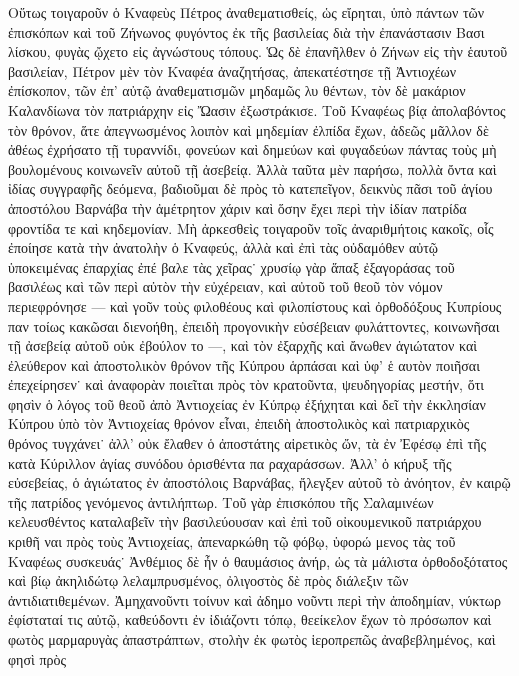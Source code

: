 Οὕτως τοιγαροῦν ὁ Κναφεὺς Πέτρος ἀναθεματισθείς,
ὡς εἴρηται, ὑπὸ πάντων τῶν ἐπισκόπων καὶ τοῦ Ζήνωνος
φυγόντος ἐκ τῆς βασιλείας διὰ τὴν ἐπανάστασιν Βασι%
λίσκου, φυγὰς ᾤχετο εἰς ἀγνώστους τόπους. Ὡς δὲ
ἐπανῆλθεν ὁ Ζήνων εἰς τὴν ἑαυτοῦ βασιλείαν, Πέτρον
μὲν τὸν Κναφέα ἀναζητήσας, ἀπεκατέστησε τῇ Ἀντιοχέων
ἐπίσκοπον, τῶν ἐπ’ αὐτῷ ἀναθεματισμῶν μηδαμῶς λυ%
θέντων, τὸν δὲ μακάριον Καλανδίωνα τὸν πατριάρχην
εἰς Ὤασιν ἐξωστράκισε. Τοῦ Κναφέως βίᾳ ἀπολαβόντος
τὸν θρόνον, ἅτε ἀπεγνωσμένος λοιπὸν καὶ μηδεμίαν
ἐλπίδα ἔχων, ἀδεῶς μᾶλλον δὲ ἀθέως ἐχρήσατο τῇ
τυραννίδι, φονεύων καὶ δημεύων καὶ φυγαδεύων πάντας
τοὺς μὴ βουλομένους κοινωνεῖν αὐτοῦ τῇ ἀσεβείᾳ. Ἀλλὰ
ταῦτα μὲν παρήσω, πολλὰ ὄντα καὶ ἰδίας συγγραφῆς
δεόμενα, βαδιοῦμαι δὲ πρὸς τὸ κατεπεῖγον, δεικνὺς πᾶσι
τοῦ ἁγίου ἀποστόλου Βαρνάβα τὴν ἀμέτρητον χάριν καὶ
ὅσην ἔχει περὶ τὴν ἰδίαν πατρίδα φροντίδα τε καὶ
κηδεμονίαν. Μὴ ἀρκεσθεὶς τοιγαροῦν τοῖς ἀναριθμήτοις
κακοῖς, οἷς ἐποίησε κατὰ τὴν ἀνατολὴν ὁ Κναφεύς, ἀλλὰ
καὶ ἐπὶ τὰς οὐδαμόθεν αὐτῷ ὑποκειμένας ἐπαρχίας ἐπέ%
βαλε τὰς χεῖρας˙ χρυσίῳ γὰρ ἅπαξ ἐξαγοράσας τοῦ
βασιλέως καὶ τῶν περὶ αὐτὸν τὴν εὐχέρειαν, καὶ αὐτοῦ
τοῦ θεοῦ τὸν νόμον περιεφρόνησε --- καὶ γοῦν τοὺς
φιλοθέους καὶ φιλοπίστους καὶ ὀρθοδόξους Κυπρίους παν%
τοίως κακῶσαι διενοήθη, ἐπειδὴ προγονικὴν εὐσέβειαν
φυλάττοντες, κοινωνῆσαι τῇ ἀσεβείᾳ αὐτοῦ οὐκ ἐβούλον%
το ---, καὶ τὸν ἐξαρχῆς καὶ ἄνωθεν ἁγιώτατον καὶ ἐλεύθερον
καὶ ἀποστολικὸν θρόνον τῆς Κύπρου ἁρπάσαι καὶ ὑφ’ ἑ%
αυτὸν ποιῆσαι ἐπεχείρησεν˙ καὶ ἀναφορὰν ποιεῖται πρὸς
τὸν κρατοῦντα, ψευδηγορίας μεστήν, ὅτι φησὶν ὁ λόγος
τοῦ θεοῦ ἀπὸ Ἀντιοχείας ἐν Κύπρῳ ἐξήχηται καὶ δεῖ
τὴν ἐκκλησίαν Κύπρου ὑπὸ τὸν Ἀντιοχείας θρόνον εἶναι,
ἐπειδὴ ἀποστολικὸς καὶ πατριαρχικὸς θρόνος τυγχάνει˙
ἀλλ’ οὐκ ἔλαθεν ὁ ἀποστάτης αἱρετικὸς ὤν, τὰ ἐν Ἐφέσῳ
ἐπὶ τῆς κατὰ Κύριλλον ἁγίας συνόδου ὁρισθέντα πα%
ραχαράσσων. Ἀλλ’ ὁ κήρυξ τῆς εὐσεβείας, ὁ ἁγιώτατος
ἐν ἀποστόλοις Βαρνάβας, ἤλεγξεν αὐτοῦ τὸ ἀνόητον, ἐν
καιρῷ τῆς πατρίδος γενόμενος ἀντιλήπτωρ. Τοῦ γὰρ
ἐπισκόπου τῆς Σαλαμινέων κελευσθέντος καταλαβεῖν τὴν
βασιλεύουσαν καὶ ἐπὶ τοῦ οἰκουμενικοῦ πατριάρχου κριθῆ%
ναι πρὸς τοὺς Ἀντιοχείας, ἀπεναρκώθη τῷ φόβῳ, ὑφορώ%
μενος τὰς τοῦ Κναφέως συσκευάς˙ Ἀνθέμιος δὲ ἦν ὁ
θαυμάσιος ἀνήρ, ὡς τὰ μάλιστα ὀρθοδοξότατος καὶ βίῳ
ἀκηλιδώτῳ λελαμπρυσμένος, ὀλιγοστὸς δὲ πρὸς διάλεξιν
τῶν ἀντιδιατιθεμένων. Ἀμηχανοῦντι τοίνυν καὶ ἀδημο%
νοῦντι περὶ τὴν ἀποδημίαν, νύκτωρ ἐφίσταταί τις
αὐτῷ, καθεύδοντι ἐν ἰδιάζοντι τόπῳ, θεείκελον ἔχων τὸ
πρόσωπον καὶ φωτὸς μαρμαρυγὰς ἀπαστράπτων, στολὴν
ἐκ φωτὸς ἱεροπρεπῶς ἀναβεβλημένος, καὶ φησὶ πρὸς
